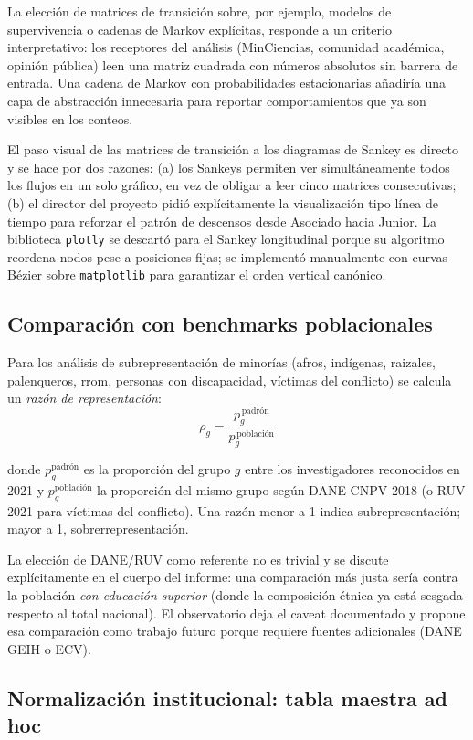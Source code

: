 \documentclass[11pt,a4paper,oneside]{article}
\begin{document}
La elección de matrices de transición sobre, por ejemplo, modelos de supervivencia o cadenas de Markov explícitas, responde a un criterio interpretativo: los receptores del análisis (MinCiencias, comunidad académica, opinión pública) leen una matriz cuadrada con números absolutos sin barrera de entrada. Una cadena de Markov con probabilidades estacionarias añadiría una capa de abstracción innecesaria para reportar comportamientos que ya son visibles en los conteos.

El paso visual de las matrices de transición a los diagramas de Sankey es directo y se hace por dos razones: (a) los Sankeys permiten ver simultáneamente todos los flujos en un solo gráfico, en vez de obligar a leer cinco matrices consecutivas; (b) el director del proyecto pidió explícitamente la visualización tipo línea de tiempo para reforzar el patrón de descensos desde Asociado hacia Junior. La biblioteca \texttt{plotly} se descartó para el Sankey longitudinal porque su algoritmo reordena nodos pese a posiciones fijas; se implementó manualmente con curvas Bézier sobre \texttt{matplotlib} para garantizar el orden vertical canónico.

\subsection{Comparación con benchmarks poblacionales}

Para los análisis de subrepresentación de minorías (afros, indígenas, raizales, palenqueros, rrom, personas con discapacidad, víctimas del conflicto) se calcula un \emph{razón de representación}:
\[
\rho_g = \frac{p_g^{\,\text{padrón}}}{p_g^{\,\text{población}}}
\]

donde $p_g^{\text{padrón}}$ es la proporción del grupo $g$ entre los investigadores reconocidos en 2021 y $p_g^{\text{población}}$ la proporción del mismo grupo según DANE-CNPV 2018 (o RUV 2021 para víctimas del conflicto). Una razón menor a 1 indica subrepresentación; mayor a 1, sobrerrepresentación.

La elección de DANE/RUV como referente no es trivial y se discute explícitamente en el cuerpo del informe: una comparación más justa sería contra la población \emph{con educación superior} (donde la composición étnica ya está sesgada respecto al total nacional). El observatorio deja el caveat documentado y propone esa comparación como trabajo futuro porque requiere fuentes adicionales (DANE GEIH o ECV).

\subsection{Normalización institucional: tabla maestra ad hoc}
\end{document}
